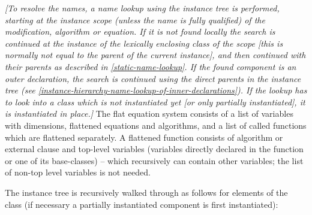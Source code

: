 \documentclass[10pt,a4paper]{report}
\begin{document}
\emph{{[}To resolve the names, a name lookup using the instance tree is
performed, starting at the instance scope (unless the name is fully
qualified) of the modification, algorithm or equation. If it is not
found locally the search is continued at the instance of the lexically
enclosing class of the scope {[}this is normally not equal to the parent
of the current instance{]}, and then continued with their parents as
described in \ref{static-name-lookup}. If the found component is an outer
declaration, the search is continued using the direct parents in the
instance tree (see \ref{instance-hierarchy-name-lookup-of-inner-declarations}). If the lookup has to look into a
class which is not instantiated yet [or only partially
  instantiated], it is instantiated in place.]}
  The flat equation system consists of a list of variables with
  dimensions, flattened equations and algorithms, and a list of called
functions which are flattened separately. A flattened function consists
of algorithm or external clause and top-level variables (variables
directly declared in the function or one of its base-classes) -- which
recursively can contain other variables; the list of non-top level
variables is not needed.

The instance tree is recursively walked through as follows for elements
of the class (if necessary a partially instantiated component is first
instantiated):
\end{document}
